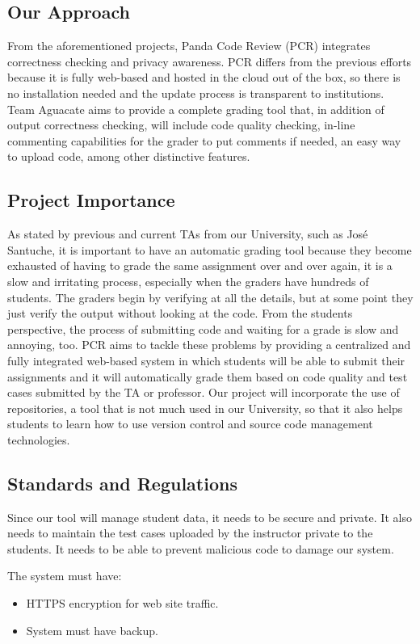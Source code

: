 \subsection{Our Approach}

From the aforementioned projects, Panda Code Review (PCR) integrates correctness
checking and privacy awareness. PCR differs from the previous efforts because it
is fully web-based and hosted in the cloud out of the box, so there is no
installation needed and the update process is transparent to institutions. Team
Aguacate aims to provide a complete grading tool that, in addition of output
correctness checking, will include code quality checking, in-line commenting
capabilities for the grader to put comments if needed, an easy way to upload
code, among other distinctive features.

\subsection{Project Importance}

As stated by previous and current TAs from our University, such as José
Santuche, it is important to have an automatic grading tool because they become
exhausted of having to grade the same assignment over and over again, it is a
slow and irritating process, especially when the graders have hundreds of
students. The graders begin by verifying at all the details, but at some point
they just verify the output without looking at the code. From the students
perspective, the process of submitting code and waiting for a grade is slow and
annoying, too. PCR aims to tackle these problems by providing a centralized and
fully integrated web-based system in which students will be able to submit their
assignments and it will automatically grade them based on code quality and test
cases submitted by the TA or professor. Our project will incorporate the use of
repositories, a tool that is not much used in our University, so that it also
helps students to learn how to use version control and source code management
technologies.

\subsection{Standards and Regulations}

Since our tool will manage student data, it needs to be secure and private. It
also needs to maintain the test cases uploaded by the instructor private to the
students. It needs to be able to prevent malicious code to damage our system.

The system must have:
\begin{itemize}
\item HTTPS encryption for web site traffic.
\item System must have backup. %
\end{itemize}

